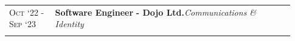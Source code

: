 \documentclass[a4paper,10pt]{extarticle} %
\begin{document}
{\vspace{0.1cm}
\begin{tabular}{>{\raggedright\arraybackslash}p{0.15\linewidth} | >{\raggedright\arraybackslash}p{0.78\linewidth}}
\textsc{Oct ‘22 - Sep ‘23} & \textbf{Software Engineer} \textbf{ - Dojo Ltd.}\hfill\textit{Communications \& Identity}\\
\multicolumn{2}{c}{} \\


\end{tabular}}
\end{document}
